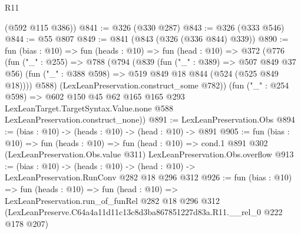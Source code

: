 \begin{lexlean}{R11}
\begin{coremodule}
      (@592 @115 @386))
@841 := @326 (@330 @287)
@843 := @326 (@333 @546)
@844 := @55 @807
@849 := @841 (@843 (@326 (@336 @844) @339))
@890 := fun (bias : @10) =>
  fun (heads : @10) =>
  fun (head : @10) =>
  @372
    (@776
      (fun ("_" : @255) =>
      @788
        (@794
          (@839
            (fun ("_" : @389) => @507 @849 @37 @56)
            (fun ("_" : @388 @598) => @519 @849 @18 @844 (@524 (@525 @849 @18))))
          @588)
        (LexLeanPreservation.construct_some @782))
      (fun ("_" : @254 @598) =>
      @602
        @150
        @45
        @62
        @165
        @165
        @293
        LexLeanTarget.TargetSyntax.Value.none
        @588
        LexLeanPreservation.construct_none))
@891 := LexLeanPreservation.Obs
@894 := (bias : @10) -> (heads : @10) -> (head : @10) -> @891
@905 := fun (bias : @10) =>
  fun (heads : @10) =>
  fun (head : @10) =>
  cond.{1} @891 @302 (LexLeanPreservation.Obs.value @311) LexLeanPreservation.Obs.overflow
@913 := (bias : @10) ->
  (heads : @10) -> (head : @10) -> LexLeanPreservation.RunConv @282 @18 @296 @312
@926 := fun (bias : @10) =>
  fun (heads : @10) =>
  fun (head : @10) =>
  LexLeanPreservation.run_of_funRel
    @282
    @18
    @296
    @312
    (LexLeanPreserve.C64a4a11d11c13c8d3ba867851227d83a.R11.__rel_0 @222 @178 @207)
\end{coremodule}
\end{lexlean}
